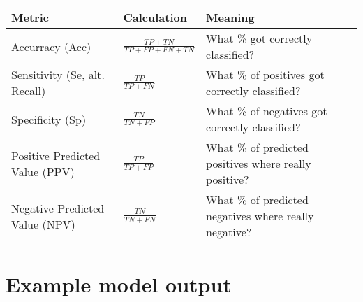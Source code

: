 \renewcommand{\arraystretch}{1.5}
\begin{table}[h!]
    \centering
    \begin{tabular}{p{3cm} p{3cm} p{4cm}}
        Metric & Calculation & Meaning \\
        \hline
        Accurracy \newline (Acc) & $\frac{TP+TN}{TP+FP+FN+TN}$ & What \% got \newline correctly classified? \\
        Sensitivity \newline (Se, alt. Recall) & $\frac{TP}{TP+FN}$ & What \% of positives \newline got correctly \newline classified? \\
        Specificity \newline (Sp) & $\frac{TN}{TN+FP}$ & What \% of negatives \newline got correctly \newline classified? \\
        Positive Predicted \newline Value (PPV) & $\frac{TP}{TP+FP}$ & What \% of predicted \newline positives where \newline really positive? \\
        Negative Predicted \newline Value (NPV) & $\frac{TN}{TN+FN}$ & What \% of predicted \newline negatives where \newline really negative? \\
    \end{tabular}
\end{table}

\section{Example model output \label{Apx-Output}}

